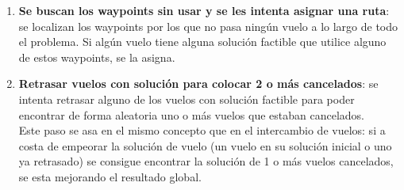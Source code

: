 \begin{enumerate}
	\item \textbf{Se buscan los waypoints sin usar y se les intenta asignar una ruta}: se localizan los waypoints por los que no pasa ningún vuelo a lo largo de todo el problema. Si algún vuelo tiene alguna solución factible que utilice alguno de estos waypoints, se la asigna. \\
	
	
	\item \textbf{Retrasar vuelos con solución para colocar 2 o más cancelados}: se intenta retrasar alguno de los vuelos con solución factible para poder encontrar de forma aleatoria uno o más vuelos que estaban cancelados.\\
	Este paso se asa en el mismo concepto que en el intercambio de vuelos: si a costa de empeorar la solución de vuelo (un vuelo en su solución inicial o uno ya retrasado) se consigue encontrar la solución de 1 o más vuelos cancelados, se esta mejorando el resultado global.
	
\end{enumerate}
